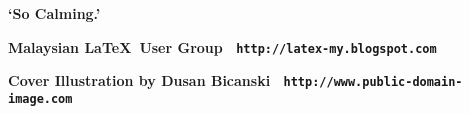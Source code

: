 \enlargethispage{3\baselineskip}
\thispagestyle{empty}
\pagecolor[HTML]{0E0407}

\begin{center}
\begin{minipage}{.8\textwidth}
\color{Cornsilk}\Large\bfseries
\lipsum[1]

\begin{center}
\huge\bfseries\sffamily\color{lime}`So Calming.'
\end{center}

\lipsum[2]

\end{minipage}
\end{center}


\begin{center}
\colorbox{white}{\EANisbn[SC4]}

\vspace*{\baselineskip}

\textbf{\textcolor{LightGoldenrod!50!Gold}{Malaysian \LaTeX\ User Group \textbullet\ \texttt{http://latex-my.blogspot.com}}}

\textbf{\textcolor{LightGoldenrod}{Cover Illustration by Dusan Bicanski \textbullet\ \texttt{http://www.public-domain-image.com}}}
\end{center}